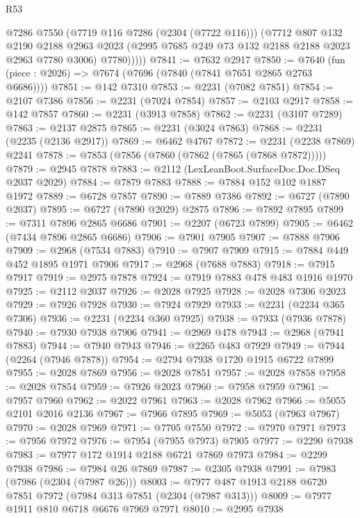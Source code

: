 \begin{lexlean}{R53}
\begin{coremodule}
            @7286
            @7550
            (@7719 @116 @7286 (@2304 (@7722 @116)))
            (@7712
              @807
              @132
              @2190
              @2188
              @2963
              @2023
              (@2995 @7685 @249 @73 @132 @2188 @2188 @2023 @2963 @7780 @3006)
              @7780)))))
@7841 := @7632 @2917
@7850 := @7640 (fun (piece : @2026) => @7674 (@7696 (@7840 (@7841 @7651 @2865 @2763 @6686))))
@7851 := @142 @7310
@7853 := @2231 (@7082 @7851)
@7854 := @2107 @7386
@7856 := @2231 (@7024 @7854)
@7857 := @2103 @2917
@7858 := @142 @7857
@7860 := @2231 (@3913 @7858)
@7862 := @2231 (@3107 @7289)
@7863 := @2137 @2875
@7865 := @2231 (@3024 @7863)
@7868 := @2231 (@2235 (@2136 @2917))
@7869 := @6462 @4767
@7872 := @2231 (@2238 @7869) @2241
@7878 := @7853 (@7856 (@7860 (@7862 (@7865 (@7868 @7872)))))
@7879 := @2945 @7878
@7883 := @2112 (LexLeanBoot.SurfaceDoc.Doc.DSeq @2037 @2029)
@7884 := @7879 @7883
@7888 := @7884 @152 @102 @1887 @1972
@7889 := @6728 @7857
@7890 := @7889 @7386
@7892 := @6727 (@7890 @2037)
@7895 := @6727 (@7890 @2029) @2875
@7896 := @7892 @7895
@7899 := @7311 @7896 @2865 @6686
@7901 := @2207 (@6723 @7899)
@7905 := @6462 (@7434 @7896 @2865 @6686)
@7906 := @7901 @7905
@7907 := @7888 @7906
@7909 := @2968 (@7534 @7883)
@7910 := @7907 @7909
@7915 := @7884 @449 @452 @1895 @1971 @7906
@7917 := @2968 (@7688 @7883)
@7918 := @7915 @7917
@7919 := @2975 @7878
@7924 := @7919 @7883 @478 @483 @1916 @1970
@7925 := @2112 @2037
@7926 := @2028 @7925
@7928 := @2028 @7306 @2023
@7929 := @7926 @7928
@7930 := @7924 @7929
@7933 := @2231 (@2234 @365 @7306)
@7936 := @2231 (@2234 @360 @7925)
@7938 := @7933 (@7936 @7878)
@7940 := @7930 @7938 @7906
@7941 := @2969 @478
@7943 := @2968 (@7941 @7883)
@7944 := @7940 @7943
@7946 := @2265 @483 @7929
@7949 := @7944 (@2264 (@7946 @7878))
@7954 := @2794 @7938 @1720 @1915 @6722 @7899
@7955 := @2028 @7869
@7956 := @2028 @7851
@7957 := @2028 @7858
@7958 := @2028 @7854
@7959 := @7926 @2023
@7960 := @7958 @7959
@7961 := @7957 @7960
@7962 := @2022 @7961
@7963 := @2028 @7962
@7966 := @5055 @2101 @2016 @2136
@7967 := @7966 @7895
@7969 := @5053 (@7963 @7967)
@7970 := @2028 @7969
@7971 := @7705 @7550
@7972 := @7970 @7971
@7973 := @7956 @7972
@7976 := @7954 (@7955 @7973) @7905
@7977 := @2290 @7938
@7983 := @7977 @172 @1914 @2188 @6721 @7869 @7973
@7984 := @2299 @7938
@7986 := @7984 @26 @7869
@7987 := @2305 @7938
@7991 := @7983 (@7986 (@2304 (@7987 @26)))
@8003 := @7977 @487 @1913 @2188 @6720 @7851 @7972 (@7984 @313 @7851 (@2304 (@7987 @313)))
@8009 := @7977 @1911 @810 @6718 @6676 @7969 @7971
@8010 := @2995 @7938

\end{coremodule}
\end{lexlean}
